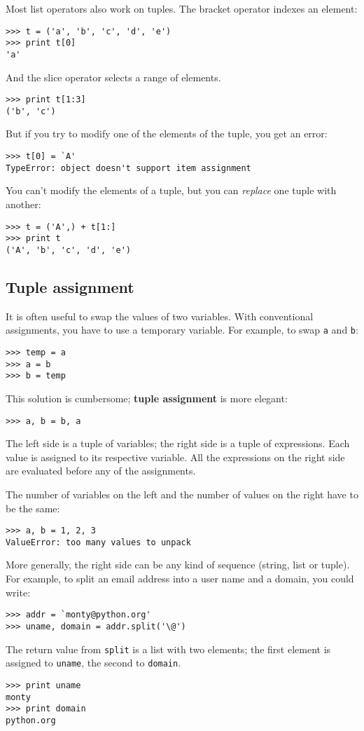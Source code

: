 \documentclass{article}
\begin{document}
Most list operators also work on tuples. The bracket operator indexes an
element:
\begin{verbatim}
>>> t = ('a', 'b', 'c', 'd', 'e')
>>> print t[0]
'a'
\end{verbatim}
And the slice operator selects a range of elements.
\begin{verbatim}
>>> print t[1:3]
('b', 'c')
\end{verbatim}
But if you try to modify one of the elements of the tuple, you get an error:
\begin{verbatim}
>>> t[0] = `A'
TypeError: object doesn't support item assignment
\end{verbatim}
You can’t modify the elements of a tuple, but you can \emph{replace}
one tuple with another:
\begin{verbatim}
>>> t = ('A',) + t[1:]
>>> print t
('A', 'b', 'c', 'd', 'e')
\end{verbatim}

\subsection{Tuple assignment}
It is often useful to swap the values of two variables. With conventional
assignments, you have to use a temporary variable.
For example, to swap \verb|a| and \verb|b|:
\begin{verbatim}
>>> temp = a
>>> a = b
>>> b = temp
\end{verbatim}
This solution is cumbersome; \textbf{tuple assignment} is more elegant:
\begin{verbatim}
>>> a, b = b, a
\end{verbatim}
The left side is a tuple of variables; the right side is a tuple of
expressions. Each value is assigned to its respective variable. All the
expressions on the right side are evaluated before any of the assignments.

The number of variables on the left and the number of values on the
right have to be the same:
\begin{verbatim}
>>> a, b = 1, 2, 3
ValueError: too many values to unpack
\end{verbatim}
More generally, the right side can be any kind of sequence (string,
list or tuple). For example, to split an email address into a user
name and a domain, you could write:
\begin{verbatim}
>>> addr = `monty@python.org'
>>> uname, domain = addr.split('\@')
\end{verbatim}
The return value from \verb|split| is a list with two elements;
the first element is assigned to \verb|uname|, the second to
\verb|domain|.
\begin{verbatim}
>>> print uname
monty
>>> print domain
python.org
\end{verbatim}
\end{document}
